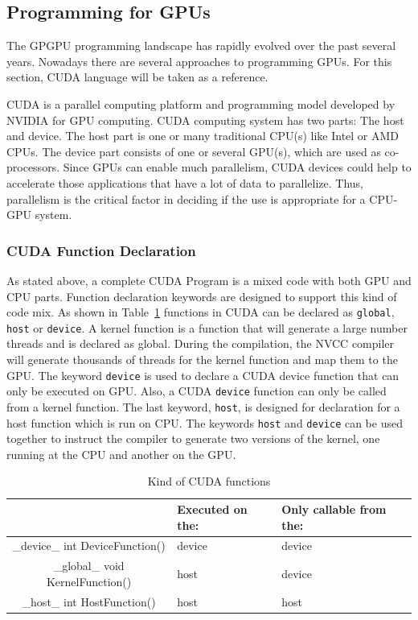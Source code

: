 \documentclass[Ingles]{ic-tese-v1}
\newcommand{\ttt}[1]{{\texttt{#1}}}
\begin{document}
\subsection{Programming for GPUs}
\label{sec:gpuprogramming}
The GPGPU programming landscape has rapidly evolved over the past several
years. Nowadays there are several approaches to
programming GPUs. For this section, CUDA language will be taken as a reference.

CUDA is a parallel computing platform and programming model developed by NVIDIA
 for GPU computing.  CUDA computing system has two parts: The host and
device.  The host part is one or many traditional CPU(s) like Intel or AMD
CPUs. The device part consists of one or several GPU(s), which are used as
co-processors. Since GPUs can enable much  parallelism, CUDA devices could
help to accelerate those applications that have a lot of data to  parallelize.
Thus, parallelism is the critical factor in deciding if the use is appropriate
for a CPU-GPU system.

\subsubsection{CUDA Function Declaration}
\label{CUDAfunction}

As stated above, a complete CUDA Program is a mixed code with both GPU and CPU
parts. Function declaration keywords are designed to support this kind of code mix. As shown in Table~\ref{tab:cudaFunction} functions in CUDA can be
declared as \ttt{global}, \ttt{host} or \ttt{device}. A kernel function is a function that will
generate a large number threads and is declared as global. During the
compilation, the NVCC compiler will generate thousands of threads for the
kernel function and map them to the GPU. The keyword \ttt{device} is used to declare
a CUDA device function that can only be executed on GPU. Also, a CUDA
\ttt{device} function can only be called from a kernel function. The last keyword,
\ttt{host}, is designed for declaration for a host function which is run on CPU. The
keywords \ttt{host} and \ttt{device} can be used  together to instruct the compiler to
generate two versions of the kernel, one running at the CPU and another on the
GPU.

\begin{table}[!t]
	\caption[small]{Kind of CUDA functions}
\begin{center}
	\begin{tabular}{ | c | >{\centering\arraybackslash}p{2cm} | >{\centering\arraybackslash}p{3cm} |}
		\hline
		 & Executed on the: & Only callable from the: \\ \hline
		{\color{blue} \_device\_} int DeviceFunction() & device & device \\ \hline
		{\color{blue} \_global\_} void KernelFunction()& host & device \\ \hline
		{\color{blue} \_host\_} int HostFunction() & host & host\\
		\hline
	\end{tabular}
\end{center}
\label{tab:cudaFunction}
\end{table}
\end{document}
